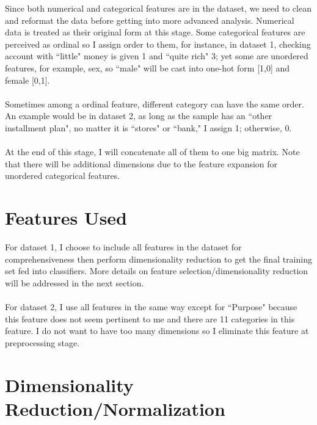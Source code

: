 \documentclass[11pt,a4paper]{article}
\begin{document}
Since both numerical and categorical features are in the dataset, we need to clean and reformat the data before getting into more advanced analysis. Numerical data is treated as their original form at this stage. Some categorical features are perceived as ordinal so I assign order to them, for instance, in dataset 1, checking account with ``little" money is given 1 and ``quite rich" 3; yet some are unordered features, for example, sex, so ``male" will be cast into one-hot form [1,0] and female [0,1]. \\\\
Sometimes among a ordinal feature, different category can have the same order. An example would be in dataset 2, as long as the sample has an ``other installment plan", no matter it is ``stores" or ``bank," I assign 1; otherwise, 0.\\\\
At the end of this stage, I will concatenate all of them to one big matrix. Note that there will be additional dimensions due to the feature expansion for unordered categorical features. 

\section{Features Used} 

For dataset 1, I choose to include all features in the dataset for comprehensiveness then perform dimensionality reduction to get the final training set fed into classifiers. More details on feature selection/dimensionality reduction will be addressed in the next section.\\\\
For dataset 2, I use all features in the same way except for ``Purpose" because this feature does not seem pertinent to me and  there are 11 categories in this feature. I do not want to have too many dimensions so I eliminate this feature at preprocessing stage. 

\section{Dimensionality Reduction/Normalization} 
\end{document}
